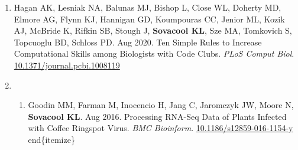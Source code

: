 \documentclass[12pt,a4paper,]{moderncv}
\providecommand{\tightlist}{%
	\setlength{\itemsep}{0pt}\setlength{\parskip}{0pt}}
\begin{document}
\begin{enumerate}
\begin{enumerate}
\begin{enumerate}
\begin{enumerate}
\begin{enumerate}
\begin{enumerate}
\begin{enumerate}
              \begin{enumerate}
              \def\labelenumviii{\arabic{enumviii}.}
              \tightlist
              \item
                Hagan AK, Lesniak NA, Balunas MJ, Bishop L, Close WL,
                Doherty MD, Elmore AG, Flynn KJ, Hannigan GD, Koumpouras
                CC, Jenior ML, Kozik AJ, McBride K, Rifkin SB, Stough J,
                \textbf{Sovacool KL}, Sze MA, Tomkovich S, Topcuoglu BD,
                Schloss PD. Aug 2020. Ten Simple Rules to Increase
                Computational Skills among Biologists with Code Clubs.
                \emph{PLoS Comput Biol}.
                \href{https://doi.org/10.1371/journal.pcbi.1008119}{10.1371/journal.pcbi.1008119}
                \newline  

                \item

                \begin{enumerate}
                \def\labelenumix{\arabic{enumix}.}
                \tightlist
                \item
                  Goodin MM, Farman M, Inocencio H, Jang C, Jaromczyk
                  JW, Moore N, \textbf{Sovacool KL}. Aug 2016.
                  Processing RNA-Seq Data of Plants Infected with Coffee
                  Ringspot Virus. \emph{BMC Bioinform}.
                  \href{https://doi.org/10.1186/s12859-016-1154-y}{10.1186/s12859-016-1154-y}
                  \newline  end\{itemize\}
                \end{enumerate}
              \end{enumerate}
            \end{enumerate}
          \end{enumerate}
        \end{enumerate}
      \end{enumerate}
    \end{enumerate}
  \end{enumerate}
\end{enumerate}
\end{document}
